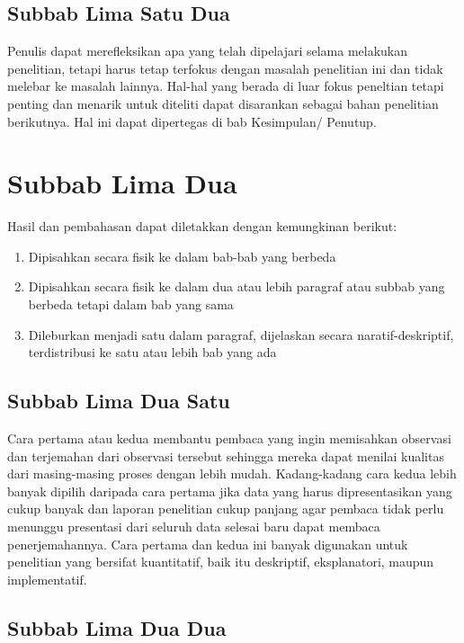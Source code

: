 \subsection{Subbab Lima Satu Dua}
Penulis dapat merefleksikan apa yang telah dipelajari selama melakukan penelitian, tetapi harus tetap terfokus dengan masalah penelitian ini dan tidak melebar ke masalah lainnya. Hal-hal yang berada di luar fokus peneltian tetapi penting dan menarik untuk diteliti dapat disarankan sebagai bahan penelitian berikutnya. Hal ini dapat dipertegas di bab Kesimpulan/ Penutup. 

\section{Subbab Lima Dua}

Hasil dan pembahasan dapat diletakkan dengan kemungkinan berikut:
\begin{enumerate}
  \item Dipisahkan secara fisik ke dalam bab-bab yang berbeda
  \item Dipisahkan secara fisik ke dalam dua atau lebih paragraf atau subbab yang berbeda tetapi dalam bab yang sama
  \item Dileburkan menjadi satu dalam paragraf, dijelaskan secara naratif-deskriptif, terdistribusi ke satu atau lebih bab yang ada 
\end{enumerate}

\subsection{Subbab Lima Dua Satu}

Cara pertama atau kedua membantu pembaca yang ingin memisahkan observasi dan terjemahan dari observasi tersebut sehingga mereka dapat menilai kualitas dari masing-masing proses dengan lebih mudah. Kadang-kadang cara kedua lebih banyak dipilih daripada cara pertama jika data yang harus dipresentasikan yang cukup banyak dan laporan penelitian cukup panjang agar pembaca tidak perlu menunggu presentasi dari seluruh data selesai baru dapat membaca penerjemahannya. Cara pertama dan kedua ini banyak digunakan untuk penelitian yang bersifat kuantitatif, baik itu deskriptif, eksplanatori, maupun implementatif.    

\subsection{Subbab Lima Dua Dua}


